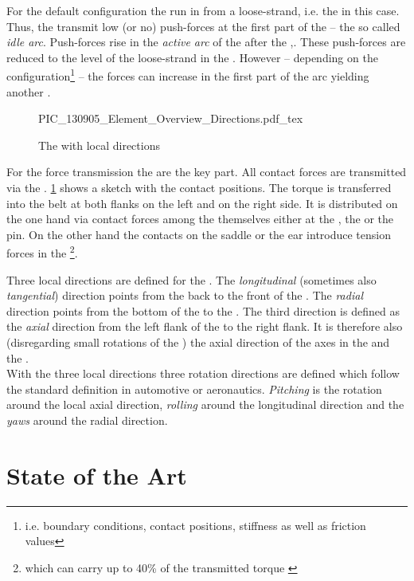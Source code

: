 For the default configuration the \els run in from a loose-strand, i.e. the \LS in this case.
Thus, the \els transmit low (or no) push-forces at the first part of the \PRI -- the so called \emph{idle arc}.
Push-forces rise in the \emph{active arc} of the \PRI after the \TAP,.
These push-forces are reduced to the level of the loose-strand in the \SEC.
However -- depending on the configuration\footnote{i.e. boundary conditions, contact positions, stiffness as well as friction values} -- the forces can increase in the first part of the arc yielding another \TAP.\par
%
\begin{figure}
  \centering
    \def\svgwidth{0.6\textwidth}{PIC_130905_Element_Overview_Directions.pdf_tex}
    \caption{The \el with local directions}
    \label{fig:PIC_130905_Element_Overview_Directions}
\end{figure}
%
For the force transmission the \els are the key part.
All contact forces are transmitted via the \els. 
\cref{fig:PIC_130905_Element_Overview_Directions} shows a sketch with the contact positions.
The torque is transferred into the belt at both flanks on the left and on the right side.
It is distributed on the one hand via contact forces among the \els themselves either at the \RE, the \head or the pin.
On the other hand the contacts on the saddle or the ear introduce tension forces in the \rings\footnote{which can carry up to 40\% of the transmitted torque \cite{srivastava_review_2009}}. 
\par

Three local directions are defined for the \el.
The \emph{longitudinal} (sometimes also \emph{tangential}) direction points from the back to the front of the \el. 
The \emph{radial} direction points from the bottom of the \el to the \head.
The third direction is defined as the \emph{axial} direction from the left flank of the \el to the right flank. 
It is therefore also (disregarding small rotations of the \el) the axial direction of the axes in the \PRI and the \SEC.\\
With the three local directions three rotation directions are defined which follow the standard definition in automotive or aeronautics.
\emph{Pitching} is the rotation around the local axial direction, \emph{rolling} around the longitudinal direction and the \el \emph{yaws} around the radial direction.

\section{State of the Art} \label{sec:StateOfTheArt}

